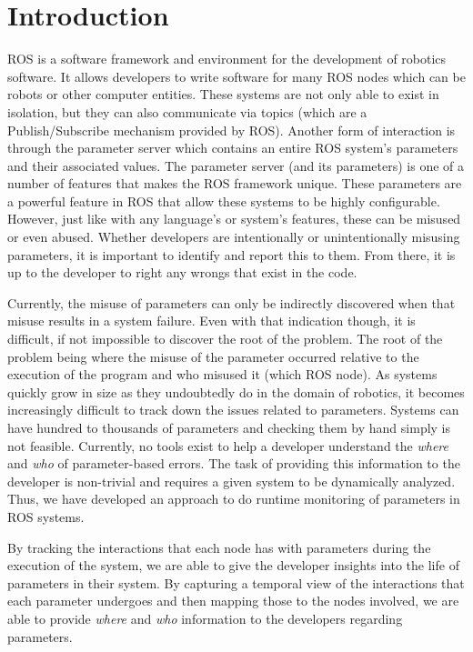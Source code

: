 \section{Introduction}

ROS is a software framework and environment for the development of robotics software. It allows developers to write software for many ROS nodes which can be robots or other computer entities. These systems are not only able to exist in isolation, but they can also communicate via topics (which are a Publish/Subscribe mechanism provided by ROS). Another form of interaction is through the parameter server which contains an entire ROS system's parameters and their associated values. The parameter server (and its parameters) is one of a number of features that makes the ROS framework unique. These parameters are a powerful feature in ROS that allow these systems to be highly configurable. However, just like with any language's or system's features, these can be misused or even abused. Whether developers are intentionally or unintentionally misusing parameters, it is important to identify and report this to them. From there, it is up to the developer to right any wrongs that exist in the code.

Currently, the misuse of parameters can only be indirectly discovered when that misuse results in a system failure. Even with that indication though, it is difficult, if not impossible to discover the root of the problem. The root of the problem being where the misuse of the parameter occurred relative to the execution of the program and who misused it (which ROS node). As systems quickly grow in size as they undoubtedly do in the domain of robotics, it becomes increasingly difficult to track down the issues related to parameters. Systems can have hundred to thousands of parameters and checking them by hand simply is not feasible. Currently, no tools exist to help a developer understand the \emph{where} and \emph{who} of parameter-based errors. The task of providing this information to the developer is non-trivial and requires a given system to be dynamically analyzed. Thus, we have developed an approach to do runtime monitoring of parameters in ROS systems.

By tracking the interactions that each node has with parameters during the execution of the system, we are able to give the developer insights into the life of parameters in their system. By capturing a temporal view of the interactions that each parameter undergoes and then mapping those to the nodes involved, we are able to provide \emph{where} and \emph{who} information to the developers regarding parameters.

